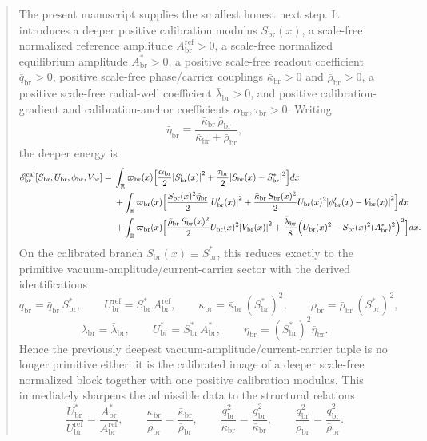 \documentclass[11pt]{article}
\newcommand{\ProfWeight}{\varpi_{\mathrm{br}}}
\newcommand{\RespVacAmp}{U_{\mathrm{br}}}
\newcommand{\RespVacRef}{U_{\mathrm{br}}^{\mathrm{ref}}}
\newcommand{\RespVacEq}{U_{\mathrm{br}}^{\ast}}
\newcommand{\RespVacPhase}{\phi_{\mathrm{br}}}
\newcommand{\RespVacCarrier}{V_{\mathrm{br}}}
\newcommand{\RespVacReadout}{q_{\mathrm{br}}}
\newcommand{\RespVacCov}{\kappa_{\mathrm{br}}}
\newcommand{\RespVacRelax}{\rho_{\mathrm{br}}}
\newcommand{\RespVacWell}{\lambda_{\mathrm{br}}}
\newcommand{\RespVacIso}{\eta_{\mathrm{br}}}
\newcommand{\RespScaleField}{S_{\mathrm{br}}}
\newcommand{\RespScaleEq}{S_{\mathrm{br}}^{\ast}}
\newcommand{\RespScaleAmpRef}{A_{\mathrm{br}}^{\mathrm{ref}}}
\newcommand{\RespScaleAmpEq}{A_{\mathrm{br}}^{\ast}}
\newcommand{\RespScaleReadout}{\bar q_{\mathrm{br}}}
\newcommand{\RespScaleCov}{\bar\kappa_{\mathrm{br}}}
\newcommand{\RespScaleRelax}{\bar\rho_{\mathrm{br}}}
\newcommand{\RespScaleWell}{\bar\lambda_{\mathrm{br}}}
\newcommand{\RespScaleIso}{\bar\eta_{\mathrm{br}}}
\newcommand{\RespScaleGrad}{\alpha_{\mathrm{br}}}
\newcommand{\RespScaleAnchor}{\tau_{\mathrm{br}}}
\newcommand{\RespScaleEnergy}{\mathscr E_{\mathrm{br}}^{\mathrm{cal}}}
\begin{document}
\begin{abstract}
The present manuscript supplies the smallest honest next step. It introduces a deeper positive calibration modulus \(\RespScaleField(x)\), a scale-free normalized reference amplitude \(\RespScaleAmpRef>0\), a scale-free normalized equilibrium amplitude \(\RespScaleAmpEq>0\), a positive scale-free readout coefficient \(\RespScaleReadout>0\), positive scale-free phase/carrier couplings \(\RespScaleCov>0\) and \(\RespScaleRelax>0\), a positive scale-free radial-well coefficient \(\RespScaleWell>0\), and positive calibration-gradient and calibration-anchor coefficients \(\RespScaleGrad,\RespScaleAnchor>0\). Writing
\[
\RespScaleIso\equiv \frac{\RespScaleCov\,\RespScaleRelax}{\RespScaleCov+\RespScaleRelax},
\]
the deeper energy is
\begin{align*}
\RespScaleEnergy[\RespScaleField,\RespVacAmp,\RespVacPhase,\RespVacCarrier]
=\;&
\int_{\mathbb R}\ProfWeight(x)\Bigl[
\frac{\RespScaleGrad}{2}\abs{\RespScaleField'(x)}^2
+
\frac{\RespScaleAnchor}{2}\abs{\RespScaleField(x)-\RespScaleEq}^2
\Bigr]dx
\nonumber\\
&+
\int_{\mathbb R}\ProfWeight(x)\Bigl[
\frac{\RespScaleField(x)^2\RespScaleIso}{2}\abs{\RespVacAmp'(x)}^2
+
\frac{\RespScaleCov\,\RespScaleField(x)^2}{2}\RespVacAmp(x)^2\abs{\RespVacPhase'(x)-\RespVacCarrier(x)}^2
\Bigr]dx
\nonumber\\
&+
\int_{\mathbb R}\ProfWeight(x)\Bigl[
\frac{\RespScaleRelax\,\RespScaleField(x)^2}{2}\RespVacAmp(x)^2\abs{\RespVacCarrier(x)}^2
+
\frac{\RespScaleWell}{8}\Bigl(\RespVacAmp(x)^2-\RespScaleField(x)^2(\RespScaleAmpEq)^2\Bigr)^2
\Bigr]dx.
\end{align*}
On the calibrated branch \(\RespScaleField(x)\equiv \RespScaleEq\), this reduces exactly to the primitive vacuum-amplitude/current-carrier sector with the derived identifications
\[
\RespVacReadout=\RespScaleReadout\,\RespScaleEq,
\qquad
\RespVacRef=\RespScaleEq\,\RespScaleAmpRef,
\qquad
\RespVacCov=\RespScaleCov\,(\RespScaleEq)^2,
\qquad
\RespVacRelax=\RespScaleRelax\,(\RespScaleEq)^2,
\]
\[
\RespVacWell=\RespScaleWell,
\qquad
\RespVacEq=\RespScaleEq\,\RespScaleAmpEq,
\qquad
\RespVacIso=(\RespScaleEq)^2\RespScaleIso.
\]
Hence the previously deepest vacuum-amplitude/current-carrier tuple is no longer primitive either: it is the calibrated image of a deeper scale-free normalized block together with one positive calibration modulus. This immediately sharpens the admissible data to the structural relations
\[
\frac{\RespVacEq}{\RespVacRef}=\frac{\RespScaleAmpEq}{\RespScaleAmpRef},
\qquad
\frac{\RespVacCov}{\RespVacRelax}=\frac{\RespScaleCov}{\RespScaleRelax},
\qquad
\frac{\RespVacReadout^2}{\RespVacCov}=\frac{\RespScaleReadout^2}{\RespScaleCov},
\qquad
\frac{\RespVacReadout^2}{\RespVacRelax}=\frac{\RespScaleReadout^2}{\RespScaleRelax}.
\]


\end{abstract}
\end{document}
